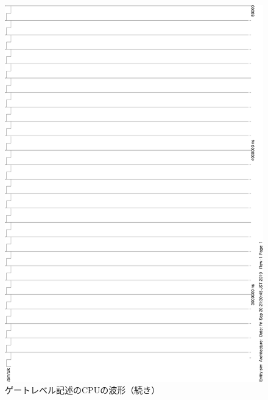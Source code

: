 \documentclass[a4j]{jarticle}
\begin{document}
\begin{figure}[p]
    \vspace*{-20mm}
    \begin{center}
        \includegraphics[height=\textheight]{wave-gate2.eps}\\[10mm]
        ゲートレベル記述のCPUの波形（続き）
    \end{center}
\end{figure}
\end{document}
